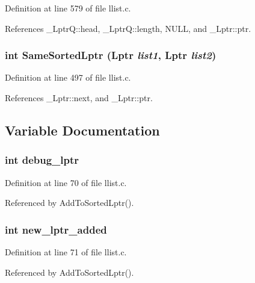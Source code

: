 Definition at line 579 of file llist.c.

References \_\-Lptr\-Q::head, \_\-Lptr\-Q::length, NULL, and \_\-Lptr::ptr.
\subsubsection{\setlength{\rightskip}{0pt plus 5cm}int Same\-Sorted\-Lptr (\bf{Lptr} {\em list1}, \bf{Lptr} {\em list2})}\label{llist_8h_afe3aa0b11464c10bcf9e796c39a74c4}




Definition at line 497 of file llist.c.

References \_\-Lptr::next, and \_\-Lptr::ptr.

\subsection{Variable Documentation}
\subsubsection{\setlength{\rightskip}{0pt plus 5cm}int \bf{debug\_\-lptr}}\label{llist_8h_a2320eeffae21baf35c127cb437b2cf1}




Definition at line 70 of file llist.c.

Referenced by Add\-To\-Sorted\-Lptr().
\subsubsection{\setlength{\rightskip}{0pt plus 5cm}int \bf{new\_\-lptr\_\-added}}\label{llist_8h_182c93597d3659b182b53e3ae2d41a60}




Definition at line 71 of file llist.c.

Referenced by Add\-To\-Sorted\-Lptr().